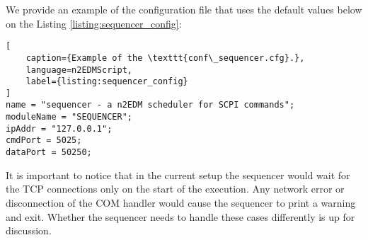 We provide an example of the configuration file that uses the default values below on the Listing \ref{listing:sequencer_config}:

\begin{lstlisting}[
	caption={Example of the \texttt{conf\_sequencer.cfg}.},
	language=n2EDMScript,
	label={listing:sequencer_config}
]
name = "sequencer - a n2EDM scheduler for SCPI commands";
moduleName = "SEQUENCER";
ipAddr = "127.0.0.1";
cmdPort = 5025;
dataPort = 50250;
\end{lstlisting}

It is important to notice that in the current setup the sequencer would wait for the TCP connections only on the start of the execution. Any network error or disconnection of the COM handler would cause the sequencer to print a warning and exit. Whether the sequencer needs to handle these cases differently is up for discussion.
